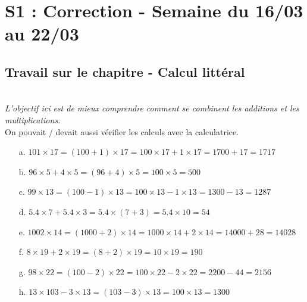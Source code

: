 \documentclass[11pt]{article}
\begin{document}

\newtheorem{Definition}{Définition}
\newtheorem{Theorem}{Théorème}
\newtheorem{Proposition}{Propriété}
\newtheorem{Exo}{Éxercice}

\renewcommand{\labelitemi}{$\bullet$}
\renewcommand{\labelitemii}{$\circ$}

\setlength{\columnseprule}{1pt}

\section{S1 : Correction - Semaine du 16/03 au 22/03}

\subsection{Travail sur le chapitre - Calcul littéral}

\\

\textit{L'objectif ici est de mieux comprendre comment se combinent les additions et les multiplications.}\\
On pouvait / devait aussi vérifier les calculs avec la calculatrice.

\begin{enumerate}
    \item[a.] $ 101 \times 17= (100 + 1) \times 17 = 100 \times 17 + 1 \times 17 = 1700 + 17 = 1717$
    \item[b.] $ 96 \times 5 + 4 \times 5 = (96 + 4) \times 5 = 100 \times 5 = 500$
    \item[c.] $ 99 \times 13= (100 - 1) \times 13 = 100 \times 13 - 1 \times 13 = 1300 - 13 = 1287$
    \item[d.] $ 5.4 \times 7 + 5.4 \times 3 = 5.4 \times (7 + 3) = 5.4 \times 10 = 54$
    \item[e.] $ 1002 \times 14= (1000 + 2) \times 14 = 1000 \times 14 + 2 \times 14 = 14000 + 28 = 14028$
    \item[f.] $ 8 \times 19 + 2 \times 19 = (8 + 2) \times 19 = 10 \times 19 = 190$
    \item[g.] $ 98 \times 22 = (100 - 2) \times 22 = 100 \times 22 - 2 \times 22 = 2200 - 44 = 2156$
    \item[h.] $ 13 \times 103 - 3 \times 13 = (103 - 3) \times 13 = 100 \times 13 = 1300$
\end{enumerate}
\end{document}
